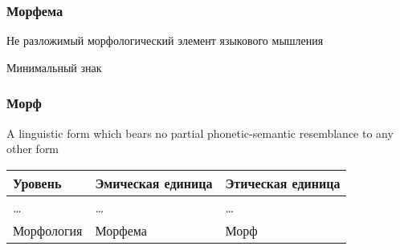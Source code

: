 \begin{frame}
    \frametitle{Морфема}

    \begin{exampleblock}{\autocite[290--291]{baudouin:1963}}
        Не разложимый морфологический элемент языкового мышления
    \end{exampleblock}

    \begin{exampleblock}{\autocite{les}}
        Минимальный знак
    \end{exampleblock}

\end{frame}

\begin{frame}
    \frametitle{Морф}

    \begin{exampleblock}{\autocite{bloomfield:1933}}
        A linguistic form which bears no partial phonetic-semantic resemblance to any other form
    \end{exampleblock}

    \begin{table}
        \begin{tabularx}{\textwidth}{XXX}
            Уровень & Эмическая единица & Этическая единица \\ \midrule \midrule
            \ldots & \ldots & \ldots \\ \midrule
            Морфология & Морфема & Морф \\
        \end{tabularx}
    \end{table}


    \begin{columns}
        \begin{center}
             
        \end{center}

   \end{columns}
\end{frame}

